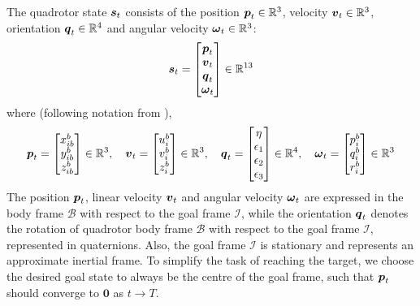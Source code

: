 The quadrotor state ${\boldsymbol{s}}_t$ consists of the position ${\boldsymbol{p}}_t \in \mathbb{R}^3$, velocity ${\boldsymbol{v}}_t \in \mathbb{R}^3$, orientation ${\boldsymbol{q}}_t \in \mathbb{R}^4$ and angular velocity ${\boldsymbol{\omega}}_t \in \mathbb{R}^3$:
\begin{equation}
    {\boldsymbol{s}}_t = \begin{bmatrix}
        {\boldsymbol{p}}_t \\
        {\boldsymbol{v}}_t \\
        {\boldsymbol{q}}_t \\
        {\boldsymbol{\omega}}_t \\
    \end{bmatrix} \in \mathbb{R}^{13}
    \label{eq:4_quadrotor_states}
\end{equation}
where (following notation from \cite{Fossen2021}), 
\begin{equation}
    {\boldsymbol{p}}_t = \begin{bmatrix}
        x^b_{ib} \\
        y^b_{ib} \\
        z^b_{ib} 
    \end{bmatrix} \in \mathbb{R}^{3}, \quad
    {\boldsymbol{v}}_t = \begin{bmatrix}
        u^b_{i} \\
        v^b_{i} \\
        z^b_{i} 
    \end{bmatrix} \in \mathbb{R}^{3}, \quad
    {\boldsymbol{q}}_t = \begin{bmatrix}
        \eta \\
        \epsilon_1 \\
        \epsilon_2 \\
        \epsilon_3
    \end{bmatrix} \in \mathbb{R}^{4}, \quad
    {\boldsymbol{\omega}}_t = \begin{bmatrix}
        p^b_{i} \\
        q^b_{i} \\
        r^b_{i} 
    \end{bmatrix} \in \mathbb{R}^{3}
    \label{eq:4_quadrotor_states_detailed}
\end{equation}
The position ${\boldsymbol{p}}_t$, linear velocity ${\boldsymbol{v}}_t$ and angular velocity ${\boldsymbol{\omega}}_t$ are expressed in the body frame $\mathcal{B}$ with respect to the goal frame $\mathcal{I}$, while the orientation ${\boldsymbol{q}}_t$ denotes the rotation of quadrotor body frame $\mathcal{B}$ with respect to the goal frame $\mathcal{I}$, represented in quaternions. Also, the goal frame $\mathcal{I}$ is stationary and represents an approximate inertial frame.
To simplify the task of reaching the target, we choose the desired goal state to always be the centre of the goal frame, such that ${\boldsymbol{p}}_t$ should converge to $\boldsymbol{0}$ as $t \rightarrow T$.

